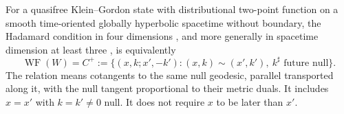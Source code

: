 \begin{theorem}
\label{f:wf-hadamard}
For a quasifree Klein--Gordon state with distributional two-point function
on a smooth time-oriented globally hyperbolic spacetime without boundary,
the Hadamard condition in four dimensions \cite{Rad}, and more generally
in spacetime dimension at least three \cite{SV}, is equivalently
\begin{equation}
 \operatorname{WF}(W)=C^+:=
 \{(x,k;x',-k'):(x,k)\sim(x',k'),\ k^\sharp\text{ future null}\}.
 \label{f:wf-spectrum}
\end{equation}
The relation means cotangents to the same null geodesic, parallel
transported along it, with the null tangent proportional to their metric
duals. It includes $x=x'$ with $k=k'\ne0$ null. It does not require
$x$ to be later than $x'$.
\end{theorem}

